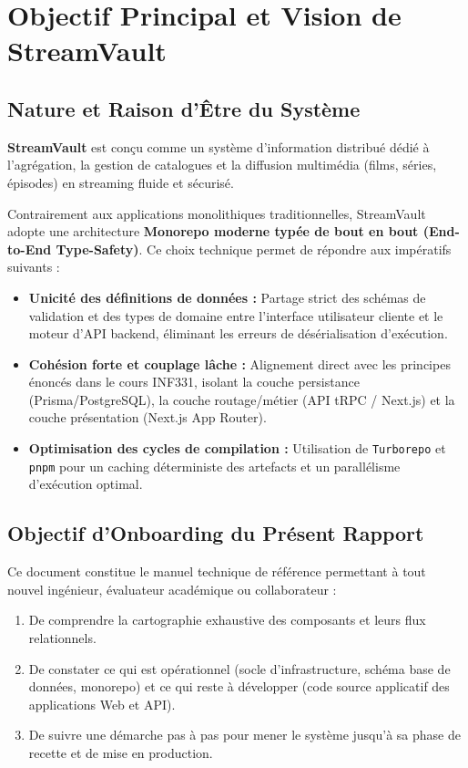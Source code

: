 \documentclass[11pt,a4paper]{article}
\begin{document}
\section{Objectif Principal et Vision de StreamVault}

\subsection{Nature et Raison d'Être du Système}
\textbf{StreamVault} est conçu comme un système d'information distribué dédié à l'agrégation, la gestion de catalogues et la diffusion multimédia (films, séries, épisodes) en streaming fluide et sécurisé. 

Contrairement aux applications monolithiques traditionnelles, StreamVault adopte une architecture \textbf{Monorepo moderne typée de bout en bout (End-to-End Type-Safety)}. Ce choix technique permet de répondre aux impératifs suivants :
\begin{itemize}
    \item \textbf{Unicité des définitions de données :} Partage strict des schémas de validation et des types de domaine entre l'interface utilisateur cliente et le moteur d'API backend, éliminant les erreurs de désérialisation d'exécution.
    \item \textbf{Cohésion forte et couplage lâche :} Alignement direct avec les principes énoncés dans le cours INF331, isolant la couche persistance (Prisma/PostgreSQL), la couche routage/métier (API tRPC / Next.js) et la couche présentation (Next.js App Router).
    \item \textbf{Optimisation des cycles de compilation :} Utilisation de \texttt{Turborepo} et \texttt{pnpm} pour un caching déterministe des artefacts et un parallélisme d'exécution optimal.
\end{itemize}

\subsection{Objectif d'Onboarding du Présent Rapport}
Ce document constitue le manuel technique de référence permettant à tout nouvel ingénieur, évaluateur académique ou collaborateur :
\begin{enumerate}
    \item De comprendre la cartographie exhaustive des composants et leurs flux relationnels.
    \item De constater ce qui est opérationnel (socle d'infrastructure, schéma base de données, monorepo) et ce qui reste à développer (code source applicatif des applications Web et API).
    \item De suivre une démarche pas à pas pour mener le système jusqu'à sa phase de recette et de mise en production.
\end{enumerate}
\end{document}
